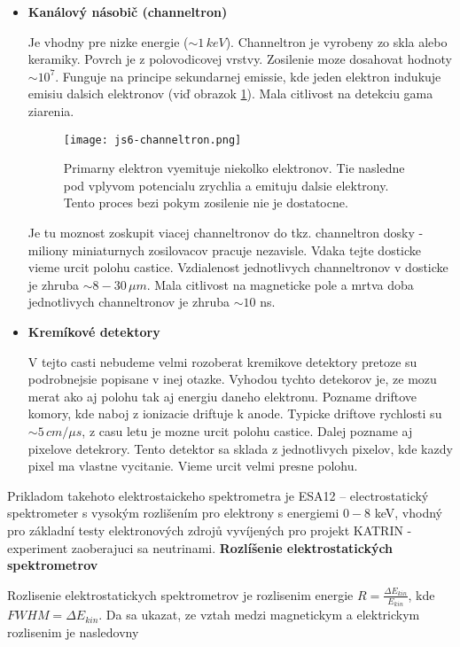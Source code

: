 \documentclass[../../main.tex]{subfiles}
\begin{document}
\begin{itemize}
	\item \textbf{Kanálový násobič (channeltron)}\par 
	Je vhodny pre nizke energie ($\sim 1\,keV$). Channeltron je vyrobeny zo skla alebo keramiky. Povrch je z polovodicovej vrstvy. Zosilenie moze dosahovat hodnoty $\sim 10^7$. Funguje na principe sekundarnej emissie, kde jeden elektron indukuje emisiu dalsich elektronov (viď obrazok \ref{js6:fig:channeltron}). Mala citlivost na detekciu gama ziarenia.
	\begin{figure}[!h]
	\centering
	\texttt{[image: js6-channeltron.png]}
	\caption{Primarny elektron vyemituje niekolko elektronov. Tie nasledne pod vplyvom potencialu zrychlia a emituju dalsie elektrony. Tento proces bezi pokym zosilenie nie je dostatocne.}
	\label{js6:fig:channeltron}
	\end{figure} \newline
	Je tu moznost zoskupit viacej channeltronov do tkz. channeltron dosky - miliony miniaturnych zosilovacov pracuje nezavisle. Vdaka tejte dosticke vieme urcit polohu castice. Vzdialenost jednotlivych channeltronov v dosticke je zhruba $\sim 8-30\,\mu m$. Mala citlivost na magneticke pole a mrtva doba jednotlivych channeltronov je zhruba $\sim 10$ ns.
	\item \textbf{Kremíkové detektory}\par
	V tejto casti nebudeme velmi rozoberat kremikove detektory pretoze su podrobnejsie popisane v inej otazke. Vyhodou tychto detekorov je, ze mozu merat ako aj polohu tak aj energiu daneho elektronu. Pozname driftove komory, kde naboj z ionizacie driftuje k anode. Typicke driftove rychlosti su $\sim 5\,cm/\mu s$, z casu letu je mozne urcit polohu castice. Dalej pozname aj pixelove detekrory. Tento detektor sa sklada z jednotlivych pixelov, kde kazdy pixel ma vlastne vycitanie. Vieme urcit velmi presne polohu. 
\end{itemize}
Prikladom takehoto elektrostaickeho spektrometra je ESA12 – electrostatický spektrometer s vysokým rozlišením pro elektrony s energiemi $0-8$ keV, vhodný pro základní testy elektronových zdrojů vyvíjených pro projekt KATRIN - experiment zaoberajuci sa neutrinami.\newline
\textbf{Rozlíšenie elektrostatických spektrometrov}\par
Rozlisenie elektrostatickych spektrometrov je rozlisenim energie $R=\frac{\Delta E_{kin}}{E_{kin}}$, kde ${FWHM=\Delta E_{kin}}$. Da sa ukazat, ze vztah medzi magnetickym a elektrickym rozlisenim je nasledovny 
\end{document}
